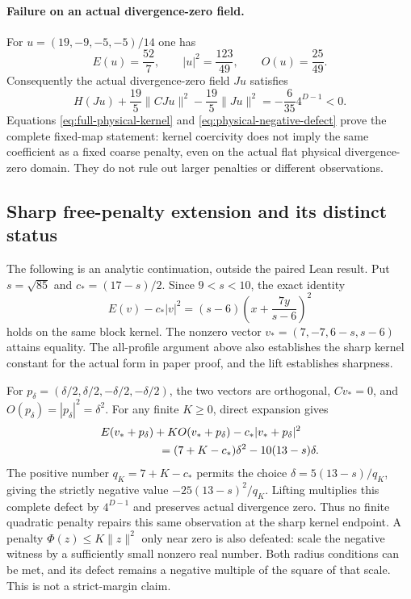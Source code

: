 \paragraph{Failure on an actual divergence-zero field.}
For $u=(19,-9,-5,-5)/14$ one has
\[
 E(u)=\frac{52}{7},\qquad |u|^2=\frac{123}{49},\qquad
 O(u)=\frac{25}{49}.
\]
Consequently the actual divergence-zero field $Ju$ satisfies
\begin{equation}\label{eq:physical-negative-defect}
 H(Ju)+\frac{19}{5}\|CJu\|^2-\frac{19}{5}\|Ju\|^2
       =-\frac{6}{35}4^{D-1}<0.
\end{equation}
Equations \eqref{eq:full-physical-kernel} and
\eqref{eq:physical-negative-defect} prove the complete fixed-map statement:
kernel coercivity does not imply the same coefficient as a fixed coarse
penalty, even on the actual flat physical divergence-zero domain.
They do not rule out larger penalties or different observations.

\subsection{Sharp free-penalty extension and its distinct status}
The following is an analytic continuation, outside the paired Lean result.
Put $s=\sqrt{85}$ and $c_*=(17-s)/2$. Since $9<s<10$, the exact identity
\[
 E(v)-c_*|v|^2=(s-6)\left(x+\frac{7y}{s-6}\right)^2
\]
holds on the same block kernel. The nonzero vector
$v_*=(7,-7,6-s,s-6)$ attains equality. The all-profile argument above
also establishes the sharp kernel constant for the actual form in paper
proof, and the lift establishes sharpness.

For $p_\delta=(\delta/2,\delta/2,-\delta/2,-\delta/2)$, the two vectors
are orthogonal, $Cv_*=0$, and $O(p_\delta)=|p_\delta|^2=\delta^2$.
For any finite $K\geq0$, direct expansion gives
\begin{align*}
 &E(v_*+p_\delta)+K O(v_*+p_\delta)-c_*|v_*+p_\delta|^2\\
 &\hspace{18mm}=(7+K-c_*)\delta^2-10(13-s)\delta.
\end{align*}
The positive number $q_K=7+K-c_*$ permits the choice
$\delta=5(13-s)/q_K$, giving the strictly negative value
$-25(13-s)^2/q_K$. Lifting multiplies this complete defect by
$4^{D-1}$ and preserves actual divergence zero. Thus no finite quadratic
penalty repairs this same observation at the sharp kernel endpoint.
A penalty $\Phi(z)\leq K\|z\|^2$ only near zero is also defeated:
scale the negative witness by a sufficiently small nonzero real number.
Both radius conditions can be met, and its defect remains a negative
multiple of the square of that scale. This is not a strict-margin claim.


